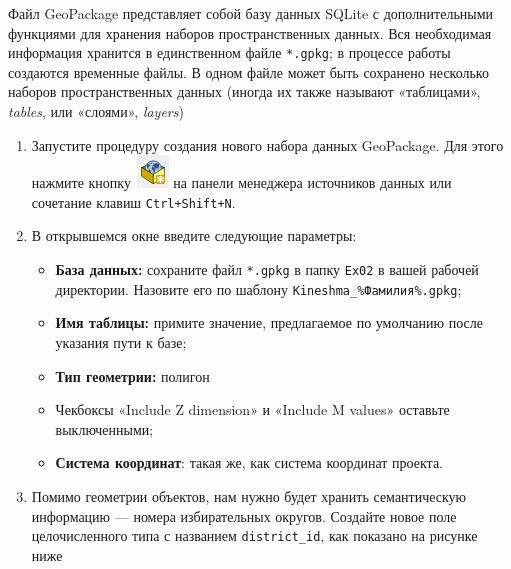 \documentclass[
  12pt,
]{book}
\providecommand{\tightlist}{%
  \setlength{\itemsep}{0pt}\setlength{\parskip}{0pt}}
\begin{document}
Файл GeoPackage представляет собой базу данных SQLite с дополнительными функциями для хранения наборов пространственных данных. Вся необходимая информация хранится в единственном файле \texttt{*.gpkg}; в процессе работы создаются временные файлы. В одном файле может быть сохранено несколько наборов пространственных данных (иногда их также называют «таблицами», \emph{tables}, или «слоями», \emph{layers})

\begin{enumerate}
\def\labelenumi{\arabic{enumi}.}
\item
  Запустите процедуру создания нового набора данных GeoPackage. Для этого нажмите кнопку \includegraphics{images/Ex05_Vectorization/new_geopackage.png} на панели менеджера источников данных или сочетание клавиш \texttt{Ctrl+Shift+N}.
\item
  В открывшемся окне введите следующие параметры:

  \begin{itemize}
  \tightlist
  \item
    \textbf{База данных:} сохраните файл \texttt{*.gpkg} в папку \texttt{Ex02} в вашей рабочей директории. Назовите его по шаблону \texttt{Kineshma\_\%Фамилия\%.gpkg};
  \item
    \textbf{Имя таблицы:} примите значение, предлагаемое по умолчанию после указания пути к базе;
  \item
    \textbf{Тип геометрии:} полигон
  \item
    Чекбоксы «Include Z dimension» и «Include M values» оставьте выключенными;
  \item
    \textbf{Система координат}: такая же, как система координат проекта.
  \end{itemize}
\item
  Помимо геометрии объектов, нам нужно будет хранить семантическую информацию --- номера избирательных округов. Создайте новое поле целочисленного типа с названием \texttt{district\_id}, как показано на рисунке ниже
\end{enumerate}
\end{document}
